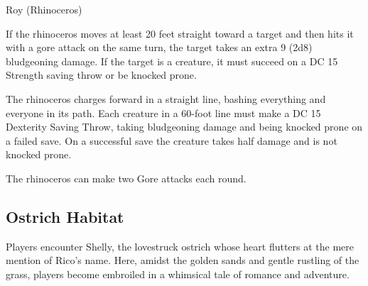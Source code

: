 \begin{DndMonster}[width=0.5\textwidth]{Roy (Rhinoceros)}

	\DndMonsterBasics[
		armor-class = {17 (Natural Armor)},
		hit-points  = {\DndDice{20d10 + 40}},
		speed       = {40 ft.},
	]

	\renewcommand{\AbilityScoreSpacer}{~}

	\DndMonsterAbilityScores[
		str = 21,
		dex = 8,
		con = 15,
		int = 2,
		wis = 12,
		cha = 6,
	]

	\DndMonsterDetails[
		skills = {Perception +1},
		senses = {passive Perception 11},
		languages = {Common},
		challenge = 6,
	]

	If the rhinoceros moves at least 20 feet straight toward a target and then hits it with a gore attack on the same turn, the target takes an extra 9 (2d8) bludgeoning damage. If the target is a creature, it must succeed on a DC 15 Strength saving throw or be knocked prone.
	
	 The rhinoceros charges forward in a straight line, bashing everything and everyone in its path. Each creature in a 60-foot line must make a DC 15 Dexterity Saving Throw, taking  bludgeoning damage and being knocked prone on a failed save. On a successful save the creature takes half damage and is not knocked prone.
	
	The rhinoceros can make two Gore attacks each round.
	
	\DndMonsterAttack[
		name=Gore,
		distance=melee, %
		mod=+7,
		reach=5,
		targets=one target,
		dmg={\DndDice{2d8 + 5}},
		dmg-type=piercing,
	]
\end{DndMonster}
\subsection*{ Ostrich Habitat}
Players encounter Shelly, the lovestruck ostrich whose heart flutters at the mere mention of Rico's name. Here, amidst the golden sands and gentle rustling of the grass, players become embroiled in a whimsical tale of romance and adventure.

